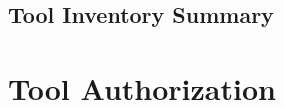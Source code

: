 \documentclass[a4paper,twoside]{sapthesis}
\begin{document}
\subsection{Tool Inventory Summary}
%
%
%
%
%
%
%
%
%

\section{Tool Authorization}
\label{sec:tool-authorization}
\end{document}
